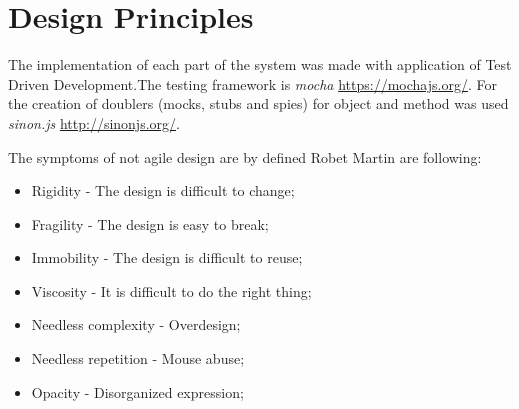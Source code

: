 \chapter{Design Principles}
\label{chap:design}
The implementation of each part of the system was made with application of Test Driven Development.The testing framework is \textit{mocha} \url{https://mochajs.org/}. For the creation of doublers (mocks, stubs and spies) for object and method was used \textit{sinon.js }\url{http://sinonjs.org/}.


The symptoms of not agile design are by defined Robet Martin are following\cite{MartinASD}:
\begin{itemize}
	\item Rigidity - The design is difficult to change;
	\item Fragility - The design is easy to break;
	\item Immobility - The design is difficult to reuse;
	\item Viscosity - It is difficult to do the right thing;
	\item Needless complexity - Overdesign;
	\item Needless repetition - Mouse abuse;
	\item Opacity - Disorganized expression;
\end{itemize}


